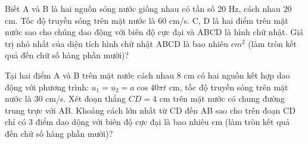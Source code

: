 \begin{ex}%
Biết A và B là hai nguồn sóng nước giống nhau có tần số 20 Hz, cách nhau 20 cm. Tốc độ truyền sóng trên mặt nước là 60 cm/s. C, D là hai điểm trên mặt nước sao cho chúng dao động với biên độ cực đại và ABCD là hình chữ nhật. Giá trị nhỏ nhất của diện tích hình chữ nhật ABCD là bao nhiêu $cm^2$ (làm tròn kết quả đến chữ số hàng phần mười)?
\end{ex} 
\begin{ex}%
Tại hai điểm A và B trên mặt nước cách nhau 8 cm có hai nguồn kết hợp dao động với phương trình: $u_1=u_2=a\cos40\pi t$ cm, tốc độ truyền sóng trên mặt nước là 30 cm/s. Xét đoạn thẳng $CD=4$ cm trên mặt nước có chung đường trung trực với AB. Khoảng cách lớn nhất từ CD đến AB sao cho trên đoạn CD chỉ có 3 điểm dao dộng với biên độ cực đại là bao nhiêu cm (làm tròn kết quả đến chữ số hàng phần mười)?
\end{ex} 













